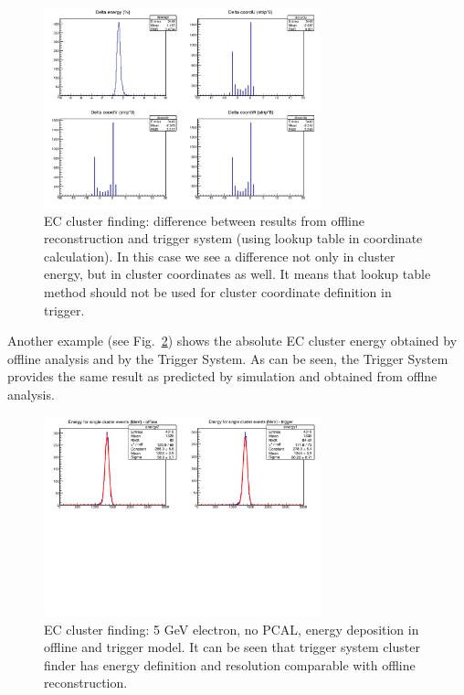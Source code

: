 \begin{figure}[htp]
	\begin{center}
		\centering
		\includegraphics[width=8cm]{img/ecal_sim2.png}
		\caption{EC cluster finding: difference between results from offline reconstruction and trigger system (using lookup table in coordinate calculation). In this case we see a difference not only in cluster energy, but in cluster coordinates as well. It means that lookup table method should not be used for cluster coordinate definition in trigger.}
		\label{fig:ecal_sim2}
	\end{center}
\end{figure} 

Another example (see Fig.~\ref{fig:ecal_sim3}) shows the absolute EC cluster energy obtained by offline analysis and by the Trigger System. As can be seen, the Trigger System provides the same result as predicted by simulation and obtained from offlne analysis.

\begin{figure}[htp]
	\begin{center}
		\centering
		\includegraphics[width=8cm]{img/ecal_sim3.png}
		\caption{EC cluster finding: 5 GeV electron, no PCAL, energy deposition in offline and trigger model. It can be seen that trigger system cluster finder has energy definition and resolution comparable with offline reconstruction.}
		\label{fig:ecal_sim3}
	\end{center}
\end{figure} 


